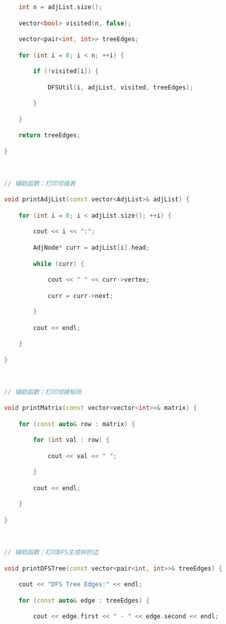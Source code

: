 \begin{lstlisting}[language=C++]
    int n = adjList.size();

    vector<bool> visited(n, false);

    vector<pair<int, int>> treeEdges;

    for (int i = 0; i < n; ++i) {

        if (!visited[i]) {

            DFSUtil(i, adjList, visited, treeEdges);

        }

    }

    return treeEdges;

}

  

// 辅助函数：打印邻接表

void printAdjList(const vector<AdjList>& adjList) {

    for (int i = 0; i < adjList.size(); ++i) {

        cout << i << ":";

        AdjNode* curr = adjList[i].head;

        while (curr) {

            cout << " " << curr->vertex;

            curr = curr->next;

        }

        cout << endl;

    }

}

  

// 辅助函数：打印邻接矩阵

void printMatrix(const vector<vector<int>>& matrix) {

    for (const auto& row : matrix) {

        for (int val : row) {

            cout << val << " ";

        }

        cout << endl;

    }

}

  

// 辅助函数：打印DFS生成树的边

void printDFSTree(const vector<pair<int, int>>& treeEdges) {

    cout << "DFS Tree Edges:" << endl;

    for (const auto& edge : treeEdges) {

        cout << edge.first << " - " << edge.second << endl;


\end{lstlisting}

